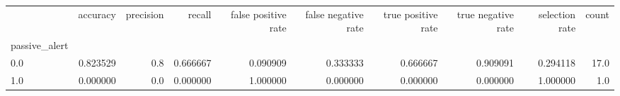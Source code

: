 \begin{tabular}{lrrrrrrrrr}
\toprule
{} &  accuracy &  precision &    recall &  false positive rate &  false negative rate &  true positive rate &  true negative rate &  selection rate &  count \\
passive\_alert &           &            &           &                      &                      &                     &                     &                 &        \\
\midrule
0.0           &  0.823529 &        0.8 &  0.666667 &             0.090909 &             0.333333 &            0.666667 &            0.909091 &        0.294118 &   17.0 \\
1.0           &  0.000000 &        0.0 &  0.000000 &             1.000000 &             0.000000 &            0.000000 &            0.000000 &        1.000000 &    1.0 \\
\bottomrule
\end{tabular}

